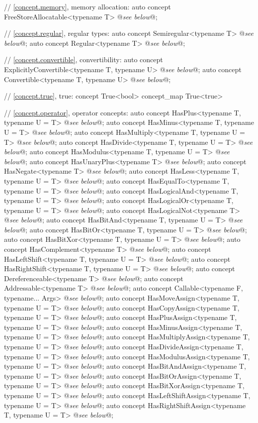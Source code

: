 \documentclass[american,twoside]{book}
\begin{document}
\begin{codeblock}
{  // \ref{concept.memory}, memory allocation:
  auto concept FreeStoreAllocatable<typename T> @\textit{see below}@;

  // \ref{concept.regular}, regular types:
  auto concept Semiregular<typename T> @\textit{see below}@;
  auto concept Regular<typename T> @\textit{see below}@;

  // \ref{concept.convertible}, convertibility:
  auto concept ExplicitlyConvertible<typename T, typename U> @\textit{see below}@;
  auto concept Convertible<typename T, typename U> @\textit{see below}@;

  // \ref{concept.true}, true:
  concept True<bool> { }
  concept_map True<true> { }

  // \ref{concept.operator}, operator concepts:
  auto concept HasPlus<typename T, typename U = T> @\textit{see below}@;
  auto concept HasMinus<typename T, typename U = T> @\textit{see below}@;
  auto concept HasMultiply<typename T, typename U = T> @\textit{see below}@;
  auto concept HasDivide<typename T, typename U = T> @\textit{see below}@;
  auto concept HasModulus<typename T, typename U = T> @\textit{see below}@;
  auto concept HasUnaryPlus<typename T> @\textit{see below}@;
  auto concept HasNegate<typename T> @\textit{see below}@;
  auto concept HasLess<typename T, typename U = T> @\textit{see below}@;
  auto concept HasEqualTo<typename T, typename U = T> @\textit{see below}@;
  auto concept HasLogicalAnd<typename T, typename U = T> @\textit{see below}@;
  auto concept HasLogicalOr<typename T, typename U = T> @\textit{see below}@;
  auto concept HasLogicalNot<typename T> @\textit{see below}@;
  auto concept HasBitAnd<typename T, typename U = T> @\textit{see below}@;
  auto concept HasBitOr<typename T, typename U = T> @\textit{see below}@;
  auto concept HasBitXor<typename T, typename U = T> @\textit{see below}@;
  auto concept HasComplement<typename T> @\textit{see below}@;
  auto concept HasLeftShift<typename T, typename U = T> @\textit{see below}@;
  auto concept HasRightShift<typename T, typename U = T> @\textit{see below}@;
  auto concept Dereferenceable<typename T> @\textit{see below}@;
  auto concept Addressable<typename T> @\textit{see below}@;
  auto concept Callable<typename F, typename... Args> @\textit{see below}@;
  auto concept HasMoveAssign<typename T, typename U = T> @\textit{see below}@;
  auto concept HasCopyAssign<typename T, typename U = T> @\textit{see below}@;
  auto concept HasPlusAssign<typename T, typename U = T> @\textit{see below}@;
  auto concept HasMinusAssign<typename T, typename U = T> @\textit{see below}@;
  auto concept HasMultiplyAssign<typename T, typename U = T> @\textit{see below}@;
  auto concept HasDivideAssign<typename T, typename U = T> @\textit{see below}@;
  auto concept HasModulusAssign<typename T, typename U = T> @\textit{see below}@;
  auto concept HasBitAndAssign<typename T, typename U = T> @\textit{see below}@;
  auto concept HasBitOrAssign<typename T, typename U = T> @\textit{see below}@;
  auto concept HasBitXorAssign<typename T, typename U = T> @\textit{see below}@;
  auto concept HasLeftShiftAssign<typename T, typename U = T> @\textit{see below}@;
  auto concept HasRightShiftAssign<typename T, typename U = T> @\textit{see below}@;

}
\end{codeblock}
\end{document}
